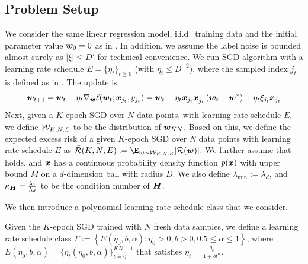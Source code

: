 \subsection{Problem Setup}
We consider the same linear regression model, i.i.d.\ training data and the initial parameter value ${\bm{w}}_0 = 0$ as in .
In addition, we assume the label noise is bounded almost surely as $|\xi|\le D'$ for technical convenience.
We run SGD algorithm with a learning rate schedule $E=\{\eta_t\}_{t\ge 0}$ (with $\eta_t\le D^{-2}$),
where the sampled index $j_t$ is defined as in . The update is
\begin{equation}
{\bm{w}}_{t+1} = {\bm{w}}_{t} - \eta_t \nabla_{{\bm{w}}}\ell({\bm{w}}_t; {\bm{x}}_{j_t}, y_{j_t}) ={\bm{w}}_t-\eta_t{\bm{x}}_{j_t}{\bm{x}}_{j_t}^{\top}\left({\bm{w}}_t-{\bm{w}}^*\right)+\eta_t\xi_{j_t}{\bm{x}}_{j_t} \nonumber
\end{equation}
Next, given a $K$-epoch SGD over $N$ data points, with learning rate schedule $E$, we define $\mathcal{W}_{K,N,E}$ to be the distribution of ${\bm{w}}_{KN}$. Based on this, we define the expected excess risk of a given $K$-epoch SGD over $N$ data points with learning rate schedule $E$ as $\bar{\cR}(K, N; E) := \E_{\vw \sim \cW_{K,N,E}}[\cR(\vw)]$. We further assume that  holds, and ${\bm{x}}$ has a continuous probability density function $p({\bm{x}})$ with upper bound $M$ on a $d$-dimension ball with radius $D$. We also define $\lambda_{\min}:=\lambda_d$, and $\kappa_{{\bm{H}}}=\frac{\lambda_1}{\lambda_d}$ to be the condition number of ${\bm{H}}$.

We then introduce a polynomial learning rate schedule class that we consider.
\begin{definition} Given the $K$-epoch SGD trained with $N$ fresh data samples, we define a learning rate schedule class $\Gamma:=\left\{E(\eta_0,b,\alpha):\eta_0>0, b>0,0.5\leq\alpha\leq1\right\}$, where $E(\eta_0,b,\alpha)=\{\eta_t(\eta_0,b,\alpha)\}_{t=0}^{KN-1}$ that satisfies $\eta_t = \frac{\eta_0}{1 + bt^{\alpha}}$.
\end{definition}


